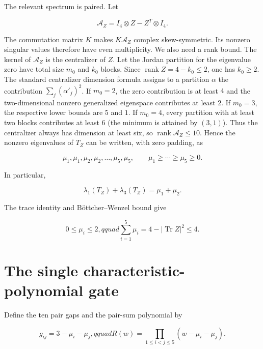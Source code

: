 \documentclass[11pt]{article}
\begin{document}
The relevant spectrum is paired. Let

\begin{equation}
\mathcal A_Z=I_4\otimes Z-Z^T\otimes I_4.
\tag{2.4}
\end{equation}

The commutation matrix $K$ makes $K\mathcal A_Z$ complex skew-symmetric. Its nonzero singular values therefore have even multiplicity. We also need a rank bound. The kernel of $\mathcal A_Z$ is the centralizer of $Z$. Let the Jordan partition for the eigenvalue zero have total size $m_0$ and $k_0$ blocks. Since $\operatorname{rank}Z=4-k_0\le2$, one has $k_0\ge2$. The standard centralizer dimension formula assigns to a partition $\alpha$ the contribution $\sum_j(\alpha'_j)^2$. If $m_0=2$, the zero contribution is at least $4$ and the two-dimensional nonzero generalized eigenspace contributes at least $2$. If $m_0=3$, the respective lower bounds are $5$ and $1$. If $m_0=4$, every partition with at least two blocks contributes at least $6$ (the minimum is attained by $(3,1)$). Thus the centralizer always has dimension at least six, so $\operatorname{rank}\mathcal A_Z\le10$. Hence the nonzero eigenvalues of $T_Z$ can be written, with zero padding, as

\begin{equation}
\mu_1,\mu_1,\mu_2,\mu_2,\ldots,\mu_5,\mu_5,
\qquad \mu_1\ge\cdots\ge\mu_5\ge0.
\tag{2.5}
\end{equation}

In particular,

\begin{equation}
\lambda_1(T_Z)+\lambda_3(T_Z)=\mu_1+\mu_2.
\tag{2.6}
\end{equation}

The trace identity and Böttcher--Wenzel bound give

\begin{equation}
0\le\mu_i\le2,qquad
\sum_{i=1}^5\mu_i=4-|\operatorname{Tr}Z|^2\le4.
\tag{2.7}
\end{equation}

\section{The single characteristic-polynomial gate}

Define the ten pair gaps and the pair-sum polynomial by

\begin{equation}
g_{ij}=3-\mu_i-\mu_j,qquad
R(w)=\prod_{1\le i<j\le5}(w-\mu_i-\mu_j).
\tag{3.1}
\end{equation}
\end{document}
